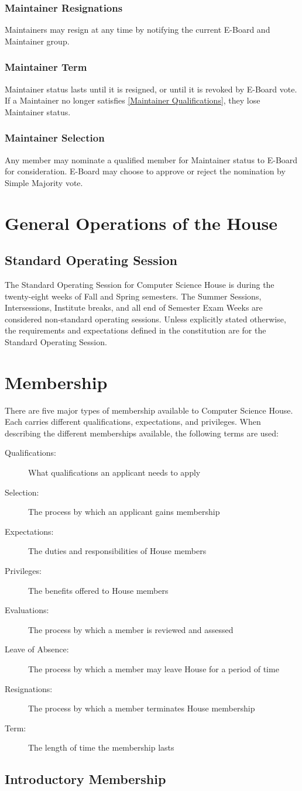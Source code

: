 \documentclass{article}
\newcommand{\article}[1]{\section{#1} \label{#1}}
\newcommand{\asection}[1]{\subsection{#1} \label{#1}}
\newcommand{\asubsection}[1]{\subsubsection{#1} \label{#1}}
\begin{document}
\asubsection{Maintainer Resignations}
Maintainers may resign at any time by notifying the current E-Board and Maintainer group.

\asubsection{Maintainer Term}
Maintainer status lasts until it is resigned, or until it is revoked by E-Board vote.
If a Maintainer no longer satisfies \ref{Maintainer Qualifications}, they lose Maintainer status.

\asubsection{Maintainer Selection}
Any member may nominate a qualified member for Maintainer status to E-Board for consideration.
E-Board may choose to approve or reject the nomination by Simple Majority vote.

\article{General Operations of the House}
\asection{Standard Operating Session}
The Standard Operating Session for Computer Science House is during the twenty-eight weeks of Fall and Spring semesters.
The Summer Sessions, Intersessions, Institute breaks, and all end of Semester Exam Weeks are considered non-standard operating sessions.
Unless explicitly stated otherwise, the requirements and expectations defined in the constitution are for the Standard Operating Session.

\article{Membership}
There are five major types of membership available to Computer Science House.
Each carries different qualifications, expectations, and privileges.
When describing the different memberships available, the following terms are used:
\begin{description}
	\item[Qualifications:] What qualifications an applicant needs to apply
	\item[Selection:] The process by which an applicant gains membership
	\item[Expectations:] The duties and responsibilities of House members
	\item[Privileges:] The benefits offered to House members
	\item[Evaluations:] The process by which a member is reviewed and assessed
	\item[Leave of Absence:] The process by which a member may leave House for a period of time
	\item[Resignations:] The process by which a member terminates House membership
	\item[Term:] The length of time the membership lasts
\end{description}

\asection{Introductory Membership}
\end{document}
